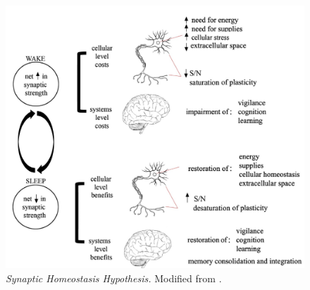 \FloatBarrier
\begin{figure}
    \centering
    \includegraphics[width=0.8\linewidth]{1_Introduction//IntroImages/Picture5.jpg}
    \caption[\textit{Synaptic Homeostasis Hypothesis}]{\textit{Synaptic Homeostasis Hypothesis.} Modified from \cite{tononi_sleep_2014}. \vspace{0.8cm}}
    \label{fig:SHY}
\end{figure}
\FloatBarrier

